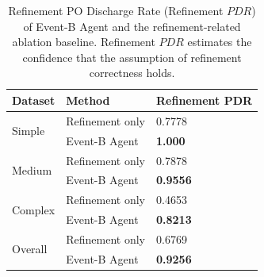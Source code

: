 \begin{table}[h!]
\begin{minipage}[c]{0.37\columnwidth}
\begin{tabular}{ll p{}}
\toprule
Dataset & Method & Refinement PDR \\
\midrule
\multirow{2}{*}{Simple} & Refinement only & 0.7778 \\
 & Event-B Agent & \textbf{1.000} \\
\midrule
\multirow{2}{*}{Medium} & Refinement only & 0.7878 \\
 & Event-B Agent & \textbf{0.9556} \\
\midrule
\multirow{2}{*}{Complex} & Refinement only & 0.4653 \\
 & Event-B Agent & \textbf{0.8213} \\
\midrule
\multirow{2}{*}{Overall} & Refinement only & 0.6769 \\
 & Event-B Agent & \textbf{0.9256} \\
\bottomrule
\end{tabular}

\caption{Refinement PO Discharge Rate (Refinement $PDR$) of Event-B Agent and the refinement-related ablation baseline.
Refinement $PDR$ estimates the confidence that the assumption of refinement correctness holds.}

\label{tab:RQ2_refine}
    
\end{minipage}

\end{table}

